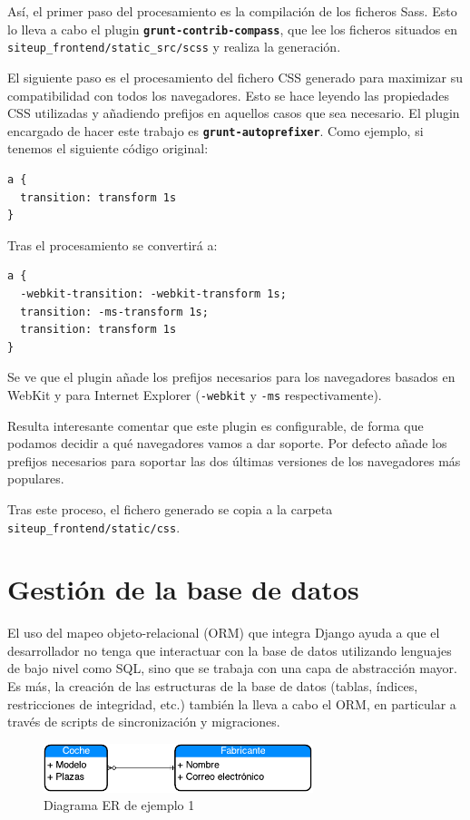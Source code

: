 Así, el primer paso del procesamiento es la compilación de los ficheros
Sass. Esto lo lleva a cabo el plugin \textbf{\texttt{grunt-contrib-compass}},
que lee los ficheros situados en \texttt{siteup\_frontend/static\_src/scss} y
realiza la generación.

El siguiente paso es el procesamiento del fichero CSS generado para maximizar su
compatibilidad con todos los navegadores. Esto se hace leyendo las propiedades
CSS utilizadas y añadiendo prefijos en aquellos casos que sea necesario. El
plugin encargado de hacer este trabajo es
\textbf{\texttt{grunt-autoprefixer}}. Como ejemplo, si tenemos el siguiente
código original:

\begin{verbatim}
a {
  transition: transform 1s
}
\end{verbatim}

Tras el procesamiento se convertirá a:

\begin{verbatim}
a {
  -webkit-transition: -webkit-transform 1s;
  transition: -ms-transform 1s;
  transition: transform 1s
}
\end{verbatim}

Se ve que el plugin añade los prefijos necesarios para los navegadores basados
en WebKit y para Internet Explorer (\texttt{-webkit} y \texttt{-ms}
respectivamente).

Resulta interesante comentar que este plugin es configurable, de forma que
podamos decidir a qué navegadores vamos a dar soporte. Por defecto añade los
prefijos necesarios para soportar las dos últimas versiones de los navegadores
más populares.

Tras este proceso, el fichero generado se copia a la carpeta
\texttt{siteup\_frontend/static/css}.

\section{Gestión de la base de datos}

El uso del mapeo objeto-relacional (ORM) que integra Django ayuda a que el
desarrollador no tenga que interactuar con la base de datos utilizando lenguajes
de bajo nivel como \ac{SQL}, sino que se trabaja con una capa de abstracción
mayor. Es más, la creación de las estructuras de la base de datos (tablas,
índices, restricciones de integridad, etc.) también la lleva a cabo el ORM, en
particular a través de scripts de sincronización y migraciones.

\begin{figure}[hbtp]
  \centering
  \includegraphics[width=0.7\textwidth]{6_implementacion/diagrama-er-1}
  \caption{Diagrama ER de ejemplo 1}
  \label{fig:er-1}
\end{figure}

